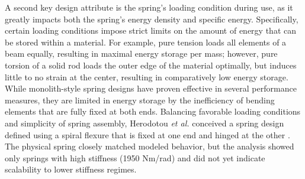 \documentclass[letterpaper, 10 pt, conference]{ieeeconf} %
\begin{document}
A second key design attribute is the spring's loading condition during use, as it greatly impacts both the spring's energy density and specific energy. Specifically, certain loading conditions impose strict limits on the amount of energy that can be stored within a material. For example, pure tension loads all elements of a beam equally, resulting in maximal energy storage per mass; however, pure torsion of a solid rod loads the outer edge of the material optimally, but induces little to no strain at the center, resulting in comparatively low energy storage. While monolith-style spring designs have proven effective in several performance measures, they are limited in energy storage by the inefficiency of bending elements that are fully fixed at both ends. Balancing favorable loading conditions and simplicity of spring assembly, Herodotou \textit{et al.} conceived a spring design defined using a spiral flexure that is fixed at one end and hinged at the other \cite{HerodotouWang2019ICORR}. The physical spring closely matched modeled behavior, but the analysis showed only springs with high stiffness (1950 Nm/rad) and did not yet indicate scalability to lower stiffness regimes.
\end{document}
